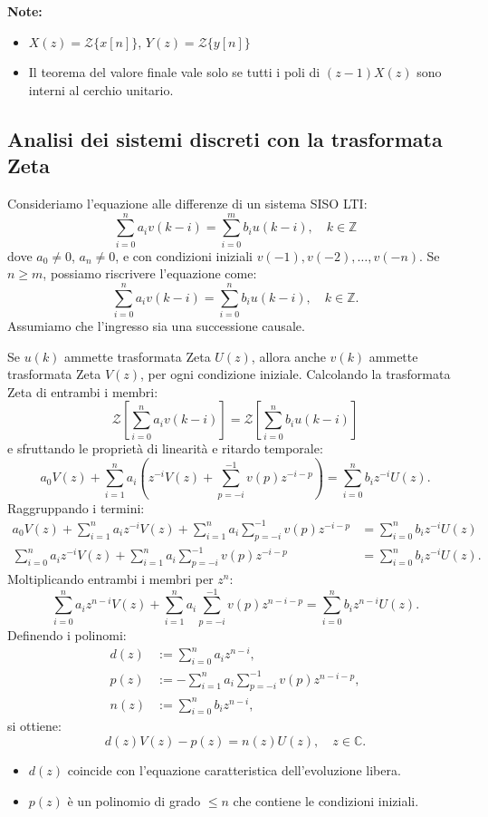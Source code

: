 \documentclass{article}
\theoremstyle{definition}
\begin{document}
\smallskip
\textbf{Note:}
\begin{itemize}
	\item $X(z) = \mathcal{Z}\{x[n]\}$, $Y(z) = \mathcal{Z}\{y[n]\}$
	\item Il teorema del valore finale vale solo se tutti i poli di $(z-1)X(z)$ sono interni al cerchio unitario.
\end{itemize}
\subsection{Analisi dei sistemi discreti con la trasformata Zeta}
Consideriamo l'equazione alle differenze di un sistema SISO LTI:
\[
\sum_{i=0}^{n} a_i v(k - i) = \sum_{i=0}^{m} b_i u(k - i), \quad k \in \mathbb{Z}
\]
dove \(a_0 \neq 0\), \(a_n \neq 0\), e con condizioni iniziali \(v(-1), v(-2), \ldots, v(-n)\).  
Se \(n \geq m\), possiamo riscrivere l'equazione come:
\[
\sum_{i=0}^{n} a_i v(k - i) = \sum_{i=0}^{n} b_i u(k - i), \quad k \in \mathbb{Z}.
\]
Assumiamo che l'ingresso sia una successione causale.

\noindent
Se \(u(k)\) ammette trasformata Zeta \(U(z)\), allora anche \(v(k)\) ammette trasformata Zeta \(V(z)\), per ogni condizione iniziale.  
Calcolando la trasformata Zeta di entrambi i membri:
\[
\mathcal{Z}\left[\sum_{i=0}^{n} a_i v(k-i)\right] = \mathcal{Z}\left[\sum_{i=0}^{n} b_i u(k-i)\right]
\]
e sfruttando le proprietà di linearità e ritardo temporale:
\[
a_0 V(z) + \sum_{i=1}^{n} a_i \left( z^{-i} V(z) + \sum_{p=-i}^{-1} v(p) z^{-i-p} \right) = \sum_{i=0}^{n} b_i z^{-i} U(z).
\]
Raggruppando i termini:
\begin{align*}
	a_0 V(z) + \sum_{i=1}^n a_i z^{-i} V(z) + \sum_{i=1}^n a_i \sum_{p=-i}^{-1} v(p) z^{-i-p} &= \sum_{i=0}^n b_i z^{-i} U(z) \\
	\sum_{i=0}^n a_i z^{-i} V(z) + \sum_{i=1}^n a_i \sum_{p=-i}^{-1} v(p) z^{-i-p} &= \sum_{i=0}^n b_i z^{-i} U(z).
\end{align*}
Moltiplicando entrambi i membri per \(z^n\):
\[
\sum_{i=0}^n a_i z^{n-i} V(z) + \sum_{i=1}^n a_i \sum_{p=-i}^{-1} v(p) z^{n-i-p} = \sum_{i=0}^n b_i z^{n-i} U(z).
\]
Definendo i polinomi:
\begin{align*}
	d(z) &:= \sum_{i=0}^{n} a_i z^{n-i}, \\
	p(z) &:= -\sum_{i=1}^{n} a_i \sum_{p=-i}^{-1} v(p) z^{n-i-p}, \\
	n(z) &:= \sum_{i=0}^{n} b_i z^{n-i},
\end{align*}
si ottiene:
\[
d(z) V(z) - p(z) = n(z) U(z), \quad z \in \mathbb{C}.
\]
\begin{itemize}
	\item \(d(z)\) coincide con l'equazione caratteristica dell'evoluzione libera.
	\item \(p(z)\) è un polinomio di grado \(\leq n\) che contiene le condizioni iniziali.
\end{itemize}
\end{document}
